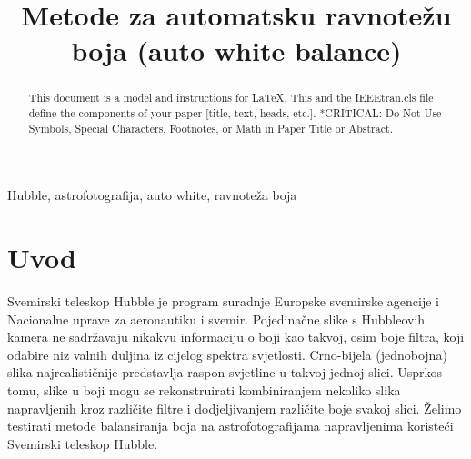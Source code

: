 \documentclass[conference]{IEEEtran}
\begin{document}
\title{Metode za automatsku
ravnotežu boja (auto white balance)
}

\author{
\and
{}
\and
{}
\and
{}
\and
{}
}

\maketitle

\begin{abstract}
This document is a model and instructions for \LaTeX.
This and the IEEEtran.cls file define the components of your paper [title, text, heads, etc.]. *CRITICAL: Do Not Use Symbols, Special Characters, Footnotes, 
or Math in Paper Title or Abstract.
\end{abstract}

\begin{IEEEkeywords}
Hubble, astrofotografija, auto white, ravnoteža boja
\end{IEEEkeywords}

\section{Uvod}
Svemirski teleskop Hubble je program suradnje Europske svemirske agencije i
Nacionalne uprave za aeronautiku i svemir. Pojedinačne slike s Hubbleovih kamera
ne sadržavaju nikakvu informaciju o boji kao takvoj, osim boje filtra, koji
odabire niz valnih duljina iz cijelog spektra svjetlosti. Crno-bijela (jednobojna)
slika najrealističnije predstavlja raspon svjetline u takvoj jednoj slici. Usprkos
tomu, slike u boji mogu se rekonstruirati kombiniranjem nekoliko slika napravljenih
kroz različite filtre i dodjeljivanjem različite boje svakoj slici. Želimo testirati
metode balansiranja boja na astrofotografijama napravljenima koristeći
Svemirski teleskop Hubble.
\end{document}
